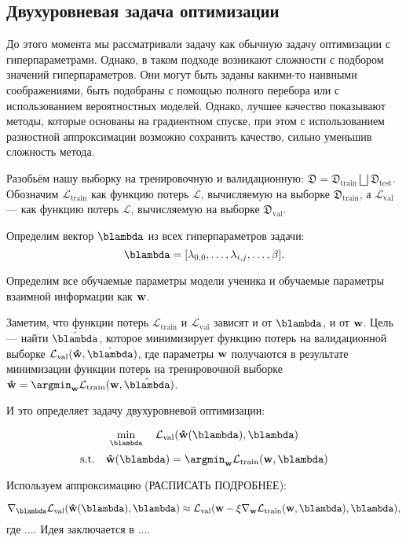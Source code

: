 \subsection{Двухуровневая задача оптимизации}

До этого момента мы рассматривали задачу как обычную задачу оптимизации с гиперпараметрами.
Однако, в таком подходе возникают сложности с подбором значений гиперпараметров.
Они могут быть заданы какими-то наивными соображениями, быть подобраны с помощью полного перебора или с использованием вероятностных моделей.
Однако, лучшее качество показывают методы, которые основаны на градиентном спуске, при этом с использованием разностной аппроксимации возможно сохранить
качество, сильно уменьшив сложность метода.

Разобьём нашу выборку на тренировочную и валидационную: $\mathfrak{D} = \mathfrak{D}_\text{train} \bigsqcup \mathfrak{D}_\text{test}.$
Обозначим $\mathcal{L}_\text{train}$ как функцию потерь $\mathcal{L}$, вычисляемую на выборке $\mathfrak{D}_\text{train}$, а $\mathcal{L}_\text{val}$ ---
как  функцию потерь $\mathcal{L}$, вычисляемую на выборке $\mathfrak{D}_\text{val}$.

Определим вектор $\blambda$ из всех гиперпараметров задачи:
$$\blambda = [\lambda_{0, 0}, \ldots, \lambda_{i, j}, \ldots, \beta].$$

Определим все обучаемые параметры модели ученика и обучаемые параметры взаимной информации как $\bold{w}$.

Заметим, что функции потерь $\mathcal{L}_\text{train}$ и $\mathcal{L}_\text{val}$ зависят и от $\blambda$, и от $\bold{w}$.
Цель --- найти $\hat{\blambda}$, которое минимизирует функцию потерь на валидационной выборке $\mathcal{L}_\text{val}(\bold{\hat{w}}, \hat{\blambda})$, где параметры $\bold{w}$
получаются в результате минимизации функции потерь на тренировочной выборке $\bold{\hat{w}} = \argmin_{\bold{w}}{\mathcal{L}_\text{train}(\bold{w}, \hat{\blambda})}$.

И это определяет задачу двухуровневой оптимизации:

$$\min_{\blambda} \quad \mathcal{L}_\text{val}(\bold{\hat{w}}(\blambda), \blambda)$$
$$\text{s.t.} \quad  \bold{\hat{w}}(\blambda) = \argmin_{\bold{w}}{\mathcal{L}_\text{train}(\bold{w}, \blambda)} $$

Используем аппроксимацию (РАСПИСАТЬ ПОДРОБНЕЕ):

$$\nabla_{\blambda}  \mathcal{L}_\text{val}(\bold{\hat{w}}(\blambda), \blambda) \approx \mathcal{L}_\text{val}(\bold{w} - \xi \nabla_{\bold{w}}\mathcal{L}_\text{train}(\bold{w}, \blambda), \blambda),$$
где .... Идея заключается в ....

